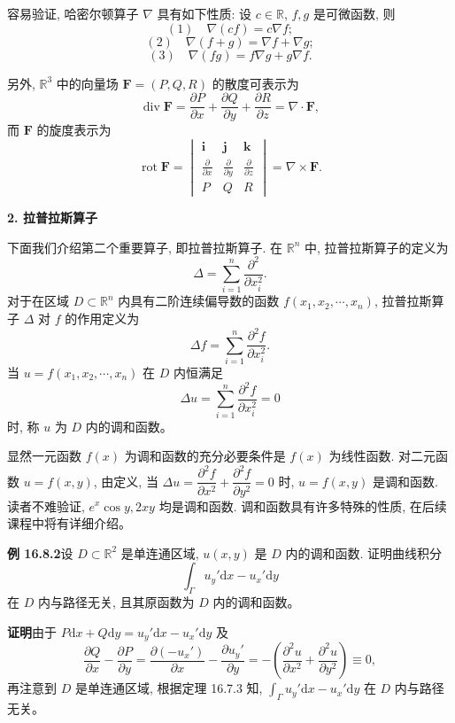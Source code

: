 \documentclass[UTF8,12pt,a4paper,fontset=fandol]{ctexart}
\begin{document}
容易验证, 哈密尔顿算子 $\nabla$ 具有如下性质: 设 $c\in\mathbb R$, $f,g$ 是可微函数, 则
\[
  (1)\quad \nabla(cf)=c\nabla f;
\]
\[
  (2)\quad \nabla(f+g)=\nabla f+\nabla g;
\]
\[
  (3)\quad \nabla(fg)=f\nabla g+g\nabla f.
\]

另外, $\mathbb R^3$ 中的向量场 $\boldsymbol F=(P,Q,R)$ 的散度可表示为
\[
  \operatorname{div}\boldsymbol F
  =
  \frac{\partial P}{\partial x}+\frac{\partial Q}{\partial y}+\frac{\partial R}{\partial z}
  =
  \nabla\cdot\boldsymbol F,
\]
而 $\boldsymbol F$ 的旋度表示为
\[
  \operatorname{rot}\boldsymbol F
  =
  \begin{vmatrix}
    \boldsymbol i&\boldsymbol j&\boldsymbol k\\
    \frac{\partial}{\partial x}&\frac{\partial}{\partial y}&\frac{\partial}{\partial z}\\
    P&Q&R
  \end{vmatrix}
  =
  \nabla\times\boldsymbol F.
\]

\noindent\textbf{2. 拉普拉斯算子}

下面我们介绍第二个重要算子, 即拉普拉斯算子. 在 $\mathbb R^n$ 中, 拉普拉斯算子的定义为
\[
  \Delta=\sum_{i=1}^n\frac{\partial^2}{\partial x_i^2}.
\]
对于在区域 $D\subset\mathbb R^n$ 内具有二阶连续偏导数的函数 $f(x_1,x_2,\cdots,x_n)$, 拉普拉斯算子 $\Delta$ 对 $f$ 的作用定义为
\[
  \Delta f=\sum_{i=1}^n\frac{\partial^2f}{\partial x_i^2}.
\]
当 $u=f(x_1,x_2,\cdots,x_n)$ 在 $D$ 内恒满足
\[
  \Delta u=\sum_{i=1}^n\frac{\partial^2f}{\partial x_i^2}=0
\]
时, 称 $u$ 为 $D$ 内的调和函数。

显然一元函数 $f(x)$ 为调和函数的充分必要条件是 $f(x)$ 为线性函数. 对二元函数 $u=f(x,y)$, 由定义, 当 $\Delta u=\dfrac{\partial^2f}{\partial x^2}+\dfrac{\partial^2f}{\partial y^2}=0$ 时, $u=f(x,y)$ 是调和函数. 读者不难验证, $e^x\cos y,2xy$ 均是调和函数. 调和函数具有许多特殊的性质, 在后续课程中将有详细介绍。

\noindent\textbf{例 16.8.2}\quad 设 $D\subset\mathbb R^2$ 是单连通区域, $u(x,y)$ 是 $D$ 内的调和函数. 证明曲线积分
\[
  \int_\Gamma u_y'\mathrm dx-u_x'\mathrm dy
\]
在 $D$ 内与路径无关, 且其原函数为 $D$ 内的调和函数。

\noindent\textbf{证明}\quad 由于 $P\mathrm dx+Q\mathrm dy=u_y'\mathrm dx-u_x'\mathrm dy$ 及
\[
  \frac{\partial Q}{\partial x}-\frac{\partial P}{\partial y}
  =
  \frac{\partial(-u_x')}{\partial x}-\frac{\partial u_y'}{\partial y}
  =
  -\left(\frac{\partial^2u}{\partial x^2}+\frac{\partial^2u}{\partial y^2}\right)
  \equiv0,
\]
再注意到 $D$ 是单连通区域, 根据定理 16.7.3 知, $\int_\Gamma u_y'\mathrm dx-u_x'\mathrm dy$ 在 $D$ 内与路径无关。
\end{document}
